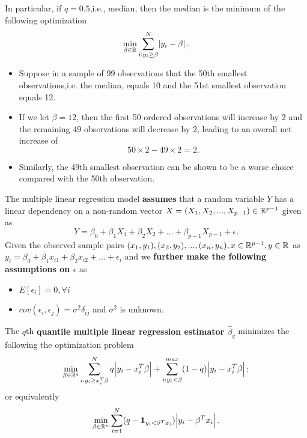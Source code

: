 \begin{refsection}
\begin{lemma}
In particular, if $q=0.5$,i.e., median, then the median is the minimum of the following optimization
$$\min_{\beta \in \mathbb{R}} \sum_{i:y_i\geq \beta}^{N} \abs{y_i-\beta}.$$
\end{lemma}


\begin{remark}\hfill
\begin{itemize}
	\item 
	Suppose in a sample of 99 observations that the 50th smallest observations,i.e. the median, equals 10 and the 51st smallest observation equals 12. 
	\item 
	If we let $\beta = 12$, then the first 50 ordered observations will increase by 2 and the remaining 49 observations will decrease by 2, leading to an overall net increase of $$50\times 2 - 49\times 2 = 2.$$
	\item Similarly, the 49th smallest observation can be shown to be a worse choice compared with the 50th observation.
\end{itemize}	 	
\end{remark}

\begin{definition}\cite[87]{cameron2005microeconometrics} 
	The multiple linear regression model \textbf{assumes} that a random variable $Y$ has a linear dependency on a non-random vector $X = (X_1,X_2,...,X_{p-1}) \in \mathbb{R}^{p-1}$ given as
	$$Y = \beta_0 + \beta_1 X_1 +\beta_2 X_2 + ... +\beta_{p-1} X_{p-1} + \epsilon.$$
	Given the observed sample pairs $(x_1,y_1),(x_2,y_2),..., (x_n,y_n), x\in \mathbb{R}^{p-1}, y\in \mathbb{R}$ as $y_i = \beta_0 + \beta_1 x_{i1} + \beta_2 x_{i2} + ... + \epsilon_i$ and we \textbf{further make the following assumptions on $\epsilon$} as
	\begin{itemize}
		\item $E[\epsilon_i] = 0,\forall i$
		\item $cov(\epsilon_i,\epsilon_j) = \sigma^2\delta_{ij}$ and $\sigma^2$ is unknown.
	\end{itemize} 	
	
The $q$th \textbf{quantile multiple linear regression estimator $\hat{\beta}_q$} minimizes the following the optimization problem
$$\min_{\beta \in \mathbb{R}^q} \sum_{i:y_i\geq x_i^T\beta}^{N} q\abs{y_i-x_i^T\beta} + \sum_{i:y_i < \beta}^{max}(1-q)\abs{y_i-x_i^T\beta};$$
or equivalently
$$\min_{\beta \in \mathbb{R}^n} \sum_{i=1}^{N} (q-\bm{1}_{y_i<\beta^Tx_i})\abs{y_i-\beta^Tx_i}.$$

\end{definition}


\end{refsection}
